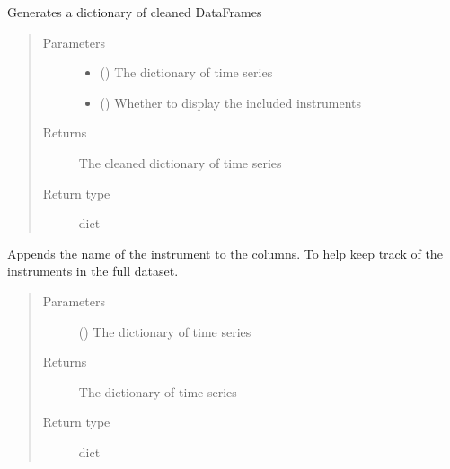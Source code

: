 \documentclass[letterpaper,10pt,english]{sphinxmanual}
\begin{document}
\begin{fulllineitems}
\label{\detokenize{preprocessing:Foresight.preprocessing.clean_dict_gen}}
Generates a dictionary of cleaned DataFrames
\begin{quote}\begin{description}
\item[{Parameters}] \leavevmode\begin{itemize}
\item {} 
 () \textendash{} The dictionary of time series

\item {} 
 () \textendash{} Whether to display the included instruments

\end{itemize}

\item[{Returns}] \leavevmode
The cleaned dictionary of time series

\item[{Return type}] \leavevmode
dict

\end{description}\end{quote}

\end{fulllineitems}


\begin{fulllineitems}
\label{\detokenize{preprocessing:Foresight.preprocessing.column_rename}}
Appends the name of the instrument to the columns.
To help keep track of the instruments in the full dataset.
\begin{quote}\begin{description}
\item[{Parameters}] \leavevmode
{} () \textendash{} The dictionary of time series

\item[{Returns}] \leavevmode
The dictionary of time series

\item[{Return type}] \leavevmode
dict

\end{description}\end{quote}

\end{fulllineitems}
\end{document}
